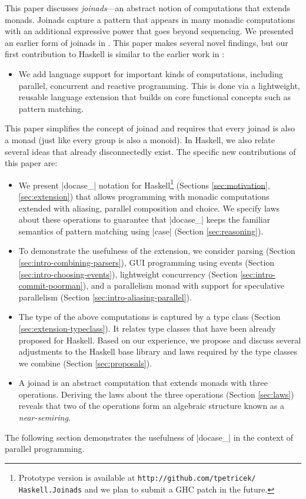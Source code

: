 \documentclass{sigplanconf}
\begin{document}
This paper discusses \textit{joinads}---an abstract notion of computations that extends monads.
Joinads capture a pattern that appears in many monadic computations with an additional expressive 
power that goes beyond sequencing. We presented an earlier form of joinads in \fsharp \cite{joinads}. 
This paper makes several novel findings, but our first contribution to Haskell is similar to the 
earlier work in \fsharp:

\begin{itemize}
\item  We add language support for important kinds of computations, including 
  parallel, concurrent and reactive programming. This is done via a lightweight, reusable language 
  extension that builds on core functional concepts such as pattern matching.

\end{itemize}
This paper simplifies the concept of joinad and requires that every joinad is also a monad (just like
every group is also a monoid). In Haskell, we also relate several ideas that already disconnectedly 
exist. The specific new contributions of this paper are:

\begin{itemize}
\item We present |docase_| notation for Haskell\footnote{Prototype version is available at 
  \texttt{http://github.com/tpetricek/ Haskell.Joinads} and we plan to submit a GHC patch in the 
  future. } (Sections \ref{sec:motivation}, \ref{sec:extension}) 
  that allows programming with monadic computations extended with aliasing, parallel composition
  and choice. We specify laws about these operations to guarantee that |docase_| keeps the familiar 
  semantics of pattern matching using |case| (Section \ref{sec:reasoning}).

\item To demonstrate the usefulness of the extension, we consider parsing
  (Section \ref{sec:intro-combining-parsers}), GUI programming using events
  (Section \ref{sec:intro-choosing-events}), lightweight concurrency
  (Section \ref{sec:intro-commit-poorman}), and a parallelism monad with
  support for speculative parallelism (Section \ref{sec:intro-aliasing-parallel}).

\item The type of the above computations is captured by a  type class (Section 
  \ref{sec:extension-typeclass}). It relates type classes that have been already proposed for 
  Haskell. Based on our experience, we propose and discuss several adjustments to the Haskell base 
  library and laws required by the type classes we combine (Section \ref{sec:proposals}). 

\item A joinad is an abstract computation that extends monads with three operations.
  Deriving the laws about the three operations (Section \ref{sec:laws}) reveals that two of
  the operations form an algebraic structure known as a \textit{near-semiring}.

\end{itemize}
The following section demonstrates the usefulness of |docase_| in the context 
of parallel programming.
\end{document}
